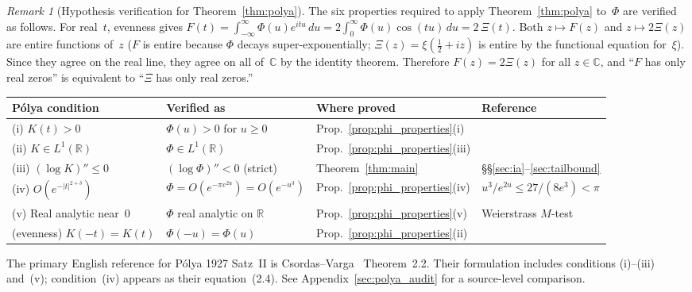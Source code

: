 \documentclass[11pt]{article}
\theoremstyle{definition}
\theoremstyle{remark}
\newtheorem{remark}[theorem]{Remark}
\begin{document}
\begin{remark}[Hypothesis verification for Theorem~\ref{thm:polya}]\label{rem:polya_hyp}
The six properties required to apply Theorem~\ref{thm:polya} to~$\Phi$ are verified as follows.
For real~$t$, evenness gives
$F(t) = \int_{-\infty}^{\infty}\Phi(u)e^{itu}\,du = 2\int_0^\infty\Phi(u)\cos(tu)\,du = 2\,\Xi(t)$.
Both $z\mapsto F(z)$ and $z\mapsto 2\Xi(z)$ are entire functions of~$z$
($F$ is entire because $\Phi$ decays super-exponentially; $\Xi(z)=\xi(\tfrac{1}{2}+iz)$ is entire
by the functional equation for~$\xi$).
Since they agree on the real line, they agree on all of~$\mathbb{C}$ by the identity theorem.
Therefore $F(z) = 2\Xi(z)$ for all $z\in\mathbb{C}$, and ``$F$ has only real zeros'' is
equivalent to ``$\Xi$ has only real zeros.''\medskip

\noindent\begin{tabular}{@{}llll@{}}
\toprule
Pólya condition & Verified as & Where proved & Reference \\
\midrule
(i) $K(t) > 0$ & $\Phi(u) > 0$ for $u \geq 0$ & Prop.~\ref{prop:phi_properties}(i) & \cite[Thm.~A]{csordas1989} \\
(ii) $K \in L^1(\mathbb{R})$ & $\Phi \in L^1(\mathbb{R})$ & Prop.~\ref{prop:phi_properties}(iii) & \cite[\S2.10]{titchmarsh1986} \\
(iii) $(\log K)'' \leq 0$ & $(\log\Phi)'' < 0$ (strict) & Theorem~\ref{thm:main} & §§\ref{sec:ia}--\ref{sec:tailbound} \\
(iv) $O(e^{-|t|^{2+\delta}})$ & $\Phi = O(e^{-\pi e^{2u}}) = O(e^{-u^3})$ & Prop.~\ref{prop:phi_properties}(iv) & $u^3/e^{2u}\leq 27/(8e^3)<\pi$ \hphantom{XX}\\
(v) Real analytic near~$0$ & $\Phi$ real analytic on $\mathbb{R}$ & Prop.~\ref{prop:phi_properties}(v) & Weierstrass $M$-test \\
(evenness) $K(-t)=K(t)$ & $\Phi(-u) = \Phi(u)$ & Prop.~\ref{prop:phi_properties}(ii) & \cite[\S2.10]{titchmarsh1986} \\
\bottomrule
\end{tabular}\medskip

\noindent The primary English reference for P\'olya 1927 Satz~II is Csordas--Varga~\cite{csordas1989} Theorem~2.2. Their formulation includes conditions (i)--(iii) and~(v); condition~(iv) appears as their equation~(2.4). See Appendix~\ref{sec:polya_audit} for a source-level comparison.
\end{remark}

\end{document}
